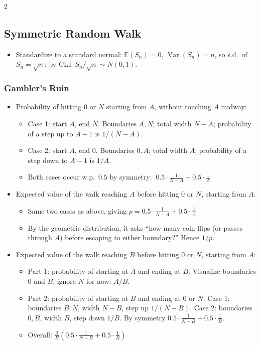 \documentclass[8pt,letterpaper]{extarticle}
\begin{document}
\begin{multicols}{2}
\subsection{Symmetric Random Walk}
\begin{itemize}
  \item Standardize to a standard normal: $\mathbb{E}(S_n)=0$, $\operatorname{Var}(S_n)=n$, so s.d.\ of $S_n=\sqrt{n}$; by CLT $S_n/\sqrt{n}\sim N(0,1)$.
\end{itemize}

\subsubsection{Gambler's Ruin}
\begin{itemize}
  \item Probability of hitting $0$ or $N$ starting from $A$, without touching $A$ midway:
    \begin{itemize}
      \item Case 1: start $A$, end $N$. Boundaries $A,N$; total width $N-A$; probability of a step up to $A+1$ is $1/(N-A)$.
      \item Case 2: start $A$, end $0$. Boundaries $0,A$; total width $A$; probability of a step down to $A-1$ is $1/A$.
      \item Both cases occur w.p.\ $0.5$ by symmetry: $\ 0.5\cdot\frac{1}{N-A}+0.5\cdot\frac{1}{A}$
    \end{itemize}
  \item Expected value of the walk reaching $A$ before hitting $0$ or $N$, starting from $A$:
    \begin{itemize}
      \item Same two cases as above, giving $p=0.5\cdot\frac{1}{N-A}+0.5\cdot\frac{1}{A}$
      \item By the geometric distribution, it asks ``how many coin flips (or passes through $A$) before escaping to either boundary?'' Hence $1/p$.
    \end{itemize}
  \item Expected value of the walk reaching $B$ before hitting $0$ or $N$, starting from $A$:
    \begin{itemize}
      \item Part 1: probability of starting at $A$ and ending at $B$. Visualize boundaries $0$ and $B$, ignore $N$ for now: $A/B$.
      \item Part 2: probability of starting at $B$ and ending at $0$ or $N$. Case 1: boundaries $B,N$, width $N-B$, step up $1/(N-B)$. Case 2: boundaries $0,B$, width $B$, step down $1/B$. By symmetry $0.5\cdot\frac{1}{N-B}+0.5\cdot\frac{1}{B}$.
      \item Overall: $\frac{A}{B}\left(0.5\cdot\frac{1}{N-B}+0.5\cdot\frac{1}{B}\right)$
    \end{itemize}
\end{itemize}


\end{multicols}
\end{document}
